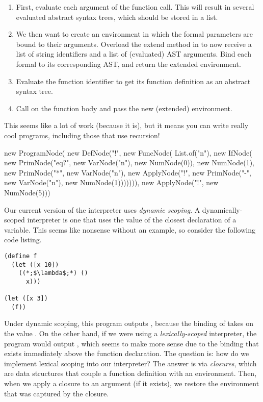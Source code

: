 \begin{enumerate}[label=(\alph*)]
  \begin{enumerate}[label=(\roman*)] 
  \item First, evaluate each argument of the function call. This will result in several evaluated abstract syntax trees, which should be stored in a list. 
  \item We then want to create an environment in which the formal parameters are bound to their arguments. Overload the extend method in  to now receive a list of string identifiers and a list of (evaluated) AST arguments. Bind each formal to its corresponding AST, and return the extended environment. 
  \item Evaluate the function identifier to get its function definition as an abstract syntax tree.
  \item Call  on the function body and pass the new (extended) environment.
  \end{enumerate}
  This seems like a lot of work (because it is), but it means you can write really cool programs, including those that use recursion!
  \begin{verbnobox}[\small]
new ProgramNode(
  new DefNode("!", 
    new FuncNode(
      List.of("n"),
      new IfNode(
        new PrimNode("eq?", 
          new VarNode("n"), 
          new NumNode(0)),
        new NumNode(1),
        new PrimNode("*", 
          new VarNode("n"), 
          new ApplyNode("!", 
            new PrimNode("-", 
            new VarNode("n"), 
            new NumNode(1))))))),
  new ApplyNode("!", new NumNode(5)))
\end{verbnobox}
\end{enumerate}

Our current version of the interpreter uses \textit{dynamic scoping}. A dynamically-scoped interpreter is one that uses the value of the closest declaration of a variable. This seems like nonsense without an example, so consider the following code listing.
\begin{lstlisting}[language=MyScheme, frame=single]
(define f
  (let ([x 10])
    ((*;$\lambda$;*) ()
      x)))

(let ([x 3])
  (f))
\end{lstlisting}

Under dynamic scoping, this program outputs , because the binding of  takes on the value . On the other hand, if we were using a \textit{lexically-scoped} interpreter, the program would output , which seems to make more sense due to the binding that exists immediately above the function declaration. The question is: how do we implement lexical scoping into our interpreter? The answer is via \textit{closures}, which are data structures that couple a function definition with an environment. Then, when we apply a closure to an argument (if it exists), we restore the environment that was captured by the closure. 

